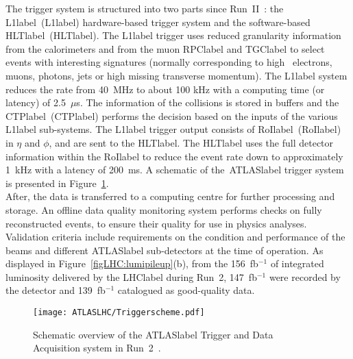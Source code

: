 The trigger system is structured into two parts since Run~II~\cite{Jenni:616089,Ruiz-Martinez:2133909}: the \acrlong{L1label}~(\acrshort{L1label}) hardware-based trigger system and the software-based \acrlong{HLTlabel}~(\acrshort{HLTlabel}). The \acrshort{L1label} trigger uses reduced granularity information from the calorimeters and from the muon \acrshort{RPClabel} and \acrshort{TGClabel} to select events with interesting signatures (normally corresponding to high \pT\ electrons, muons, photons, jets or high missing transverse momentum). The \acrshort{L1label} system reduces the rate from 40~MHz to about 100 kHz with a computing time (or latency) of 2.5~$\mu$s. The information of the collisions is stored in buffers and the \acrlong{CTPlabel}~(\acrshort{CTPlabel}) performs the decision based on the inputs of the various \acrshort{L1label} sub-systems. The \acrshort{L1label} trigger output consists of \acrlong{RoIlabel}~(\acrshort{RoIlabel}) in $\eta$ and $\phi$, and are sent to the \acrshort{HLTlabel}. The \acrshort{HLTlabel} uses the full detector information within the \acrshort{RoIlabel} to reduce the event rate down to approximately 1~kHz with a latency of 200~ms. A schematic of the~\acrshort{ATLASlabel} trigger system is presented in Figure~\ref{figLHC:ATLASTDAQ}.\\

After, the data is transferred to a computing centre for further processing and storage. An offline data quality monitoring system performs checks on fully reconstructed events, to ensure their quality for use in physics analyses. Validation criteria include requirements on the condition and performance of the beams and different \acrshort{ATLASlabel} sub-detectors at the time of operation. As displayed in Figure~\ref{figLHC:lumipileup}(b), from the 156~fb$^{-1}$ of integrated luminosity delivered by the \acrshort{LHClabel} during Run~2, 147~fb$^{-1}$ were recorded by the detector and 139~fb$^{-1}$ catalogued as good-quality data.

\begin{figure}[htbp]
    \RawFloats
    \begin{center}
    \texttt{[image: ATLASLHC/Triggerscheme.pdf]}
    \caption{
        Schematic overview of the \acrshort{ATLASlabel} Trigger and Data Acquisition system in Run~2~\cite{publicTDAQ}. 
    }
    \label{figLHC:ATLASTDAQ}
    \end{center}
\end{figure}